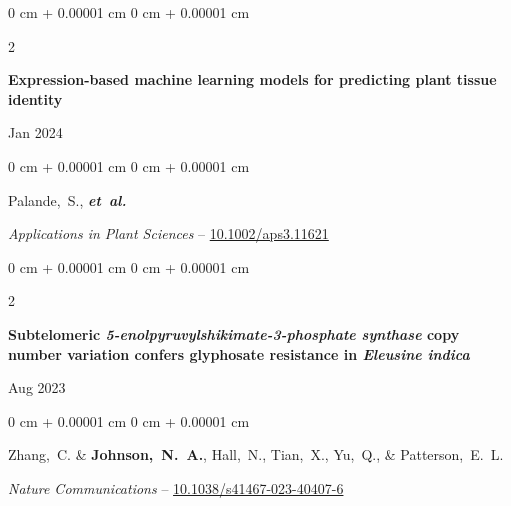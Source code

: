 \documentclass[10pt, letterpaper]{article}
\newenvironment{onecolentry}{
    \begin{adjustwidth}{
        0 cm + 0.00001 cm
    }{
        0 cm + 0.00001 cm
    }
}{
    \end{adjustwidth}
} %
\newenvironment{twocolentry}[2][]{
    \onecolentry
    \def\secondColumn{#2}
    \setcolumnwidth{\fill, 4.5 cm}
    \begin{paracol}{2}
}{
    \switchcolumn \raggedleft \secondColumn
    \end{paracol}
    \endonecolentry
} %
\begin{document}
        
        \begin{samepage}
            \begin{twocolentry}{
                Jan 2024
                }
                \textbf{Expression-based machine learning models for predicting plant tissue identity}
            \end{twocolentry}

            \vspace{0.10 cm}
            
            \begin{onecolentry}
                \mbox{Palande, S.}, \mbox{\textbf{\textit{et al.}}}

                \vspace{0.10 cm}
                
                \textit{Applications in Plant Sciences} -- \href{https://doi.org/10.1002/aps3.11621}{10.1002/aps3.11621}
            \end{onecolentry}
        \end{samepage}


        \vspace{0.2 cm}
        

        \begin{samepage}
            \begin{twocolentry}{
                Aug 2023
            }
                \textbf{Subtelomeric \textit{5-enolpyruvylshikimate-3-phosphate synthase} copy number variation confers glyphosate resistance in \textit{Eleusine indica}}
            \end{twocolentry}

            \vspace{0.10 cm}
            
            \begin{onecolentry}
                \mbox{Zhang, C.} \& \mbox{\textbf{Johnson, N. A.}}, \mbox{Hall, N.}, \mbox{Tian, X.}, \mbox{Yu, Q.}, \& \mbox{Patterson, E. L.}

                \vspace{0.10 cm}
                
                \textit{Nature Communications} -- \href{https://doi.org/10.1038/s41467-023-40407-6}{10.1038/s41467-023-40407-6}
            \end{onecolentry}
        \end{samepage}


        
\end{document}
